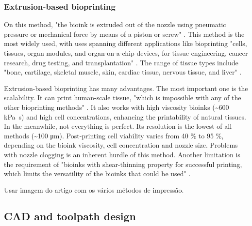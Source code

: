 
\subsubsection{Extrusion-based bioprinting}
\label{subsubsec:extrusion_based_bioprinting}

On this method, "the bioink is extruded out of the nozzle using pneumatic pressure or mechanical force by means of a piston or screw" \cite{Vijayavenkataraman2018_bioprinting_tissues_organs_regen_med}. This method is the most widely used, with uses spanning different applications like bioprinting "cells, tissues, organ modules, and organ-on-a-chip devices, for tissue engineering, cancer research, drug testing, and transplantation" \cite{Vijayavenkataraman2018_bioprinting_tissues_organs_regen_med}. The range of tissue types include "bone, cartilage, skeletal muscle, skin, cardiac tissue, nervous tissue, and liver" \cite{Vijayavenkataraman2018_bioprinting_tissues_organs_regen_med}.

Extrusion-based bioprinting has many advantages. The most important one is the scalability. It can print human-scale tissue, "which is impossible with any of the other bioprinting methods" \cite{Vijayavenkataraman2018_bioprinting_tissues_organs_regen_med}. It also works with high viscosity bioinks (\textasciitilde 600 \si{\kilo\pascal\second}) and high cell concentrations, enhancing the printability of natural tissues. In the meanwhile, not everything is perfect. Its resolution is the lowest of all methods (\textasciitilde 100 \si{\micro\meter}). Post-printing cell viability varies from 40 \% to 95 \%, depending on the bioink viscosity, cell concentration and nozzle size. Problems with nozzle clogging is an inherent hurdle of this method. Another limitation is the requirement of "bioinks with shear-thinning property for successful printing, which limits the versatility of the bioinks that could be used" \cite{Vijayavenkataraman2018_bioprinting_tissues_organs_regen_med}.


{\color{red}Usar imagem do artigo com os vários métodos de impressão.} 


\subsection{CAD and toolpath design}
\label{subsec:cad_toolpath_design}

